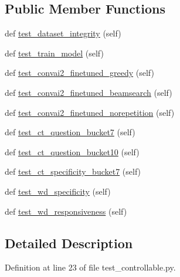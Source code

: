 \subsection*{Public Member Functions}
\begin{DoxyCompactItemize}
\item 
def \hyperlink{classtest__controllable_1_1TestControllableDialogue_afb3df76378e7449db2a4122568d8a8b2}{test\+\_\+dataset\+\_\+integrity} (self)
\item 
def \hyperlink{classtest__controllable_1_1TestControllableDialogue_ad46fe0ecf2f0b42e60424d1c7b37a2f5}{test\+\_\+train\+\_\+model} (self)
\item 
def \hyperlink{classtest__controllable_1_1TestControllableDialogue_af293a117beb40fbfe28314beb4b88f35}{test\+\_\+convai2\+\_\+finetuned\+\_\+greedy} (self)
\item 
def \hyperlink{classtest__controllable_1_1TestControllableDialogue_a436d2be9796b5afb7a4656e614107d48}{test\+\_\+convai2\+\_\+finetuned\+\_\+beamsearch} (self)
\item 
def \hyperlink{classtest__controllable_1_1TestControllableDialogue_a12a49b51265fc21d9f1fe7a8dc45538a}{test\+\_\+convai2\+\_\+finetuned\+\_\+norepetition} (self)
\item 
def \hyperlink{classtest__controllable_1_1TestControllableDialogue_aad1b8cd43766d6bfe04339c5ed7f3830}{test\+\_\+ct\+\_\+question\+\_\+bucket7} (self)
\item 
def \hyperlink{classtest__controllable_1_1TestControllableDialogue_ab33835878eb846bcc457a90072bb06bd}{test\+\_\+ct\+\_\+question\+\_\+bucket10} (self)
\item 
def \hyperlink{classtest__controllable_1_1TestControllableDialogue_a1cf543f3400075fe15ae7eea6b51156c}{test\+\_\+ct\+\_\+specificity\+\_\+bucket7} (self)
\item 
def \hyperlink{classtest__controllable_1_1TestControllableDialogue_a357a886c76cc4d72cc2345eaee912f46}{test\+\_\+wd\+\_\+specificity} (self)
\item 
def \hyperlink{classtest__controllable_1_1TestControllableDialogue_acc29f953a7fb51ef9a0dedafa8129cc2}{test\+\_\+wd\+\_\+responsiveness} (self)
\end{DoxyCompactItemize}


\subsection{Detailed Description}


Definition at line 23 of file test\+\_\+controllable.\+py.



